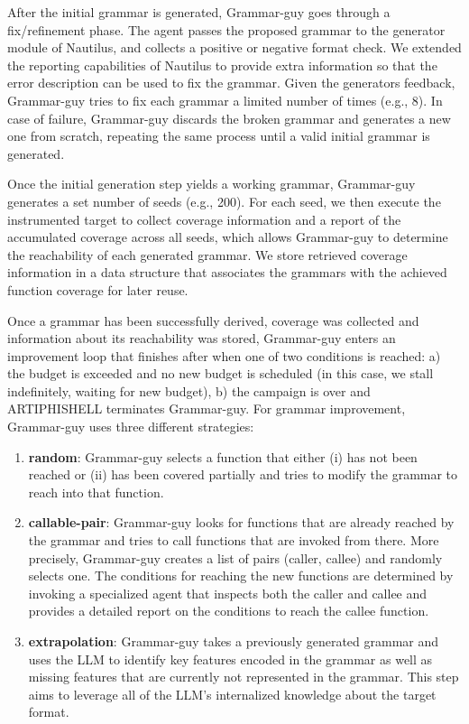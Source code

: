 %
After the initial grammar is generated, Grammar-guy goes through a fix/refinement phase. The agent passes the proposed grammar to the generator module of Nautilus, and collects a positive or negative format check. We extended the reporting capabilities of Nautilus to provide extra information so that the error description can be used to fix the grammar. Given the generators feedback, Grammar-guy tries to fix each grammar a limited number of times (e.g., 8). In case of failure, Grammar-guy discards the broken grammar and generates a new one from scratch, repeating the same process until a valid initial grammar is generated.

Once the initial generation step yields a working grammar, Grammar-guy generates a set number of seeds (e.g., 200). For each seed, we  then execute the instrumented target to collect coverage information and a report of the accumulated coverage across all seeds, which allows Grammar-guy to determine the reachability of each generated grammar. We store retrieved coverage information in a data structure that associates the grammars with the achieved function coverage for later reuse.


Once a grammar has been successfully derived, coverage was collected and information about its reachability was stored, Grammar-guy enters an improvement loop that finishes after when one of two conditions is reached: a) the budget is exceeded and no new budget is scheduled (in this case, we stall indefinitely, waiting for new budget), b) the campaign is over and ARTIPHISHELL terminates Grammar-guy.
For grammar improvement, Grammar-guy uses three different strategies:
%
\begin{enumerate}
\item \textbf{random}: Grammar-guy selects a function that either (i) has not been reached or (ii) has been covered partially and tries to modify the grammar to reach into that function.
\item \textbf{callable-pair}: Grammar-guy looks for functions that are already reached by the grammar and tries to call functions that are invoked from there. More precisely, Grammar-guy creates a list of pairs (caller, callee) and randomly selects one.
The conditions for reaching the new functions are determined by invoking a specialized agent that inspects both the caller and callee and provides a detailed report on the conditions to reach the callee function.
\item \textbf{extrapolation}: Grammar-guy takes a previously generated grammar and uses the LLM to identify key features encoded in the grammar as well as missing features that are currently not represented in the grammar. This step aims to leverage all of the LLM's internalized knowledge about the target format.
\end{enumerate}
%

